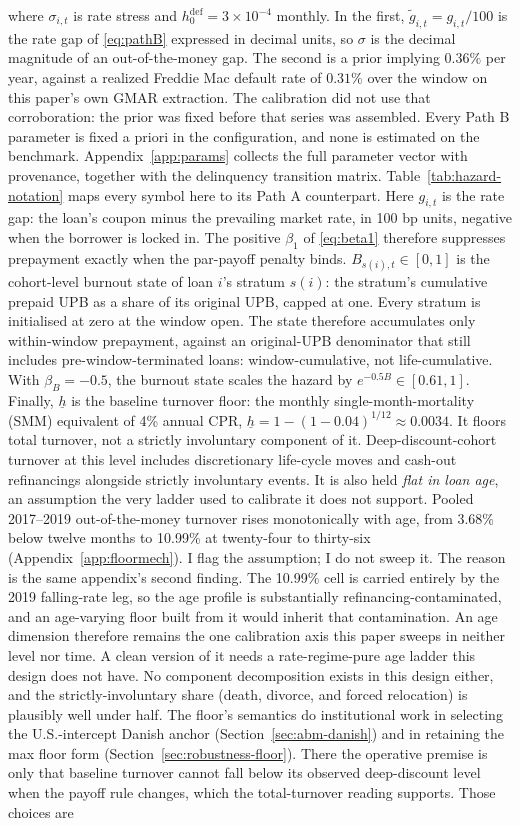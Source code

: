 \documentclass[12pt]{article}
\begin{document}
where $\sigma_{i,t}$ is rate stress and $h^{\mathrm{def}}_0 = 3\times10^{-4}$ monthly. In the first, $\tilde g_{i,t} = g_{i,t}/100$ is the rate gap of \eqref{eq:pathB} expressed in decimal units, so $\sigma$ is the decimal magnitude of an out-of-the-money gap. The second is a prior implying $0.36\%$ per year, against a realized Freddie Mac default rate of $0.31\%$ over the window on this paper's own GMAR extraction. The calibration did not use that corroboration: the prior was fixed before that series was assembled. Every Path B parameter is fixed a priori in the configuration, and none is estimated on the benchmark. Appendix~\ref{app:params} collects the full parameter vector with provenance, together with the delinquency transition matrix. Table~\ref{tab:hazard-notation} maps every symbol here to its Path A counterpart. Here $g_{i,t}$ is the rate gap: the loan's coupon minus the prevailing market rate, in 100 bp units, negative when the borrower is locked in. The positive $\beta_1$ of \eqref{eq:beta1} therefore suppresses prepayment exactly when the par-payoff penalty binds. $B_{s(i),t} \in [0,1]$ is the cohort-level burnout state of loan $i$'s stratum $s(i)$: the stratum's cumulative prepaid UPB as a share of its original UPB, capped at one. Every stratum is initialised at zero at the window open. The state therefore accumulates only within-window prepayment, against an original-UPB denominator that still includes pre-window-terminated loans: window-cumulative, not life-cumulative. With $\beta_B = -0.5$, the burnout state scales the hazard by $e^{-0.5 B} \in [0.61, 1]$. Finally, $\underline{h}$ is the baseline turnover floor: the monthly single-month-mortality (SMM) equivalent of 4\% annual CPR, $\underline{h} = 1-(1-0.04)^{1/12} \approx 0.0034$. It floors total turnover, not a strictly involuntary component of it. Deep-discount-cohort turnover at this level includes discretionary life-cycle moves and cash-out refinancings alongside strictly involuntary events. It is also held \emph{flat in loan age}, an assumption the very ladder used to calibrate it does not support. Pooled 2017--2019 out-of-the-money turnover rises monotonically with age, from 3.68\% below twelve months to 10.99\% at twenty-four to thirty-six (Appendix~\ref{app:floormech}). I flag the assumption; I do not sweep it. The reason is the same appendix's second finding. The 10.99\% cell is carried entirely by the 2019 falling-rate leg, so the age profile is substantially refinancing-contaminated, and an age-varying floor built from it would inherit that contamination. An age dimension therefore remains the one calibration axis this paper sweeps in neither level nor time. A clean version of it needs a rate-regime-pure age ladder this design does not have. No component decomposition exists in this design either, and the strictly-involuntary share (death, divorce, and forced relocation) is plausibly well under half. The floor's semantics do institutional work in selecting the U.S.-intercept Danish anchor (Section~\ref{sec:abm-danish}) and in retaining the max floor form (Section~\ref{sec:robustness-floor}). There the operative premise is only that baseline turnover cannot fall below its observed deep-discount level when the payoff rule changes, which the total-turnover reading supports. Those choices are 
\end{document}
